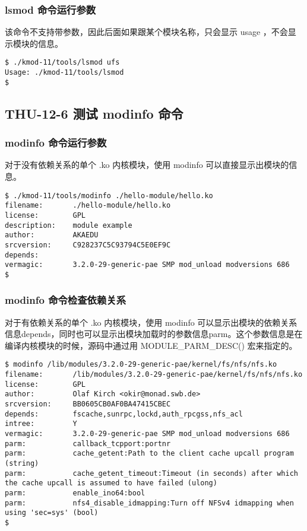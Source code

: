 \documentclass[11pt,a4paper]{article}
\begin{document}
\subsubsection{lsmod 命令运行参数}

该命令不支持带参数，因此后面如果跟某个模块名称，只会显示 usage
，不会显示模块的信息。

{\begin{shaded}\begin{verbatim}
$ ./kmod-11/tools/lsmod ufs
Usage: ./kmod-11/tools/lsmod
$
\end{verbatim}\end{shaded}}
\subsection{THU-12-6 测试 modinfo 命令}

\subsubsection{modinfo 命令运行参数}

对于没有依赖关系的单个 .ko 内核模块，使用 modinfo
可以直接显示出模块的信息。

{\begin{shaded}\begin{verbatim}
$ ./kmod-11/tools/modinfo ./hello-module/hello.ko 
filename:       ./hello-module/hello.ko
license:        GPL
description:    module example 
author:         AKAEDU
srcversion:     C928237C5C93794C5E0EF9C
depends:        
vermagic:       3.2.0-29-generic-pae SMP mod_unload modversions 686 
$ 
\end{verbatim}\end{shaded}}
\subsubsection{modinfo 命令检查依赖关系}

对于有依赖关系的单个 .ko 内核模块，使用 modinfo
可以显示出模块的依赖关系信息depends，同时也可以显示出模块加载时的参数信息parm。这个参数信息是在编译内核模块的时候，源码中通过用
MODULE\_PARM\_DESC() 宏来指定的。

{\begin{shaded}\begin{verbatim}
$ modinfo /lib/modules/3.2.0-29-generic-pae/kernel/fs/nfs/nfs.ko 
filename:       /lib/modules/3.2.0-29-generic-pae/kernel/fs/nfs/nfs.ko
license:        GPL
author:         Olaf Kirch <okir@monad.swb.de>
srcversion:     BB0605CB0AF0BA47415CBEC
depends:        fscache,sunrpc,lockd,auth_rpcgss,nfs_acl
intree:         Y
vermagic:       3.2.0-29-generic-pae SMP mod_unload modversions 686 
parm:           callback_tcpport:portnr
parm:           cache_getent:Path to the client cache upcall program (string)
parm:           cache_getent_timeout:Timeout (in seconds) after which the cache upcall is assumed to have failed (ulong)
parm:           enable_ino64:bool
parm:           nfs4_disable_idmapping:Turn off NFSv4 idmapping when using 'sec=sys' (bool)
$ 
\end{verbatim}\end{shaded}}
\end{document}

